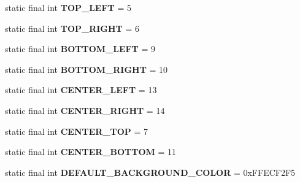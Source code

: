 \begin{DoxyCompactItemize}
\item 
\hypertarget{interfacehype_1_1util_1_1_h_constants_a49179d38e7d0cb1c0499e717565427e0}{static final int {\bfseries T\-O\-P\-\_\-\-L\-E\-F\-T} = 5}\label{interfacehype_1_1util_1_1_h_constants_a49179d38e7d0cb1c0499e717565427e0}

\item 
\hypertarget{interfacehype_1_1util_1_1_h_constants_afb0f2c47b1e7b887005393f0b8151563}{static final int {\bfseries T\-O\-P\-\_\-\-R\-I\-G\-H\-T} = 6}\label{interfacehype_1_1util_1_1_h_constants_afb0f2c47b1e7b887005393f0b8151563}

\item 
\hypertarget{interfacehype_1_1util_1_1_h_constants_a19fd6780ac656fcace641b57e45edcf2}{static final int {\bfseries B\-O\-T\-T\-O\-M\-\_\-\-L\-E\-F\-T} = 9}\label{interfacehype_1_1util_1_1_h_constants_a19fd6780ac656fcace641b57e45edcf2}

\item 
\hypertarget{interfacehype_1_1util_1_1_h_constants_a0da056b42c443a89a8f2cfc6ec28ae00}{static final int {\bfseries B\-O\-T\-T\-O\-M\-\_\-\-R\-I\-G\-H\-T} = 10}\label{interfacehype_1_1util_1_1_h_constants_a0da056b42c443a89a8f2cfc6ec28ae00}

\item 
\hypertarget{interfacehype_1_1util_1_1_h_constants_a066566d911f32f635bbef9af1ae3c1df}{static final int {\bfseries C\-E\-N\-T\-E\-R\-\_\-\-L\-E\-F\-T} = 13}\label{interfacehype_1_1util_1_1_h_constants_a066566d911f32f635bbef9af1ae3c1df}

\item 
\hypertarget{interfacehype_1_1util_1_1_h_constants_a0da49828ca4be26c0326eda84bcba534}{static final int {\bfseries C\-E\-N\-T\-E\-R\-\_\-\-R\-I\-G\-H\-T} = 14}\label{interfacehype_1_1util_1_1_h_constants_a0da49828ca4be26c0326eda84bcba534}

\item 
\hypertarget{interfacehype_1_1util_1_1_h_constants_a11e25e60dfbf2f2d578aaad41f138d6d}{static final int {\bfseries C\-E\-N\-T\-E\-R\-\_\-\-T\-O\-P} = 7}\label{interfacehype_1_1util_1_1_h_constants_a11e25e60dfbf2f2d578aaad41f138d6d}

\item 
\hypertarget{interfacehype_1_1util_1_1_h_constants_a8667d6fd79e3d3c24f0514048869e4f1}{static final int {\bfseries C\-E\-N\-T\-E\-R\-\_\-\-B\-O\-T\-T\-O\-M} = 11}\label{interfacehype_1_1util_1_1_h_constants_a8667d6fd79e3d3c24f0514048869e4f1}

\item 
\hypertarget{interfacehype_1_1util_1_1_h_constants_acfbafae9559742c30815d2dfac985e70}{static final int {\bfseries D\-E\-F\-A\-U\-L\-T\-\_\-\-B\-A\-C\-K\-G\-R\-O\-U\-N\-D\-\_\-\-C\-O\-L\-O\-R} = 0x\-F\-F\-E\-C\-F2\-F5}\label{interfacehype_1_1util_1_1_h_constants_acfbafae9559742c30815d2dfac985e70}


\end{DoxyCompactItemize}
